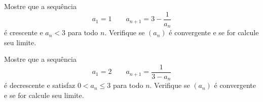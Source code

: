 \begin{exercises}
\begin{exercise}
  Mostre que a sequência
  \[
  a_1 = 1
  \qquad
  a_{n+1} = 3 - \frac{1}{a_n}
  \]
  é crescente e $a_n<3$ para todo $n$.
  Verifique se $(a_n)$ é convergente e se for calcule seu limite.
\end{exercise}

\begin{exercise}
  Mostre que a sequência
  \[
    a_1 = 2
    \qquad
    a_{n+1} = \frac{1}{3-a_n}
  \]
  é decrescente e satisfaz $0<a_n\leq 3$ para todo $n$.
  Verifique se $(a_n)$ é convergente e se for calcule seu limite.
\end{exercise}



\end{exercises}
